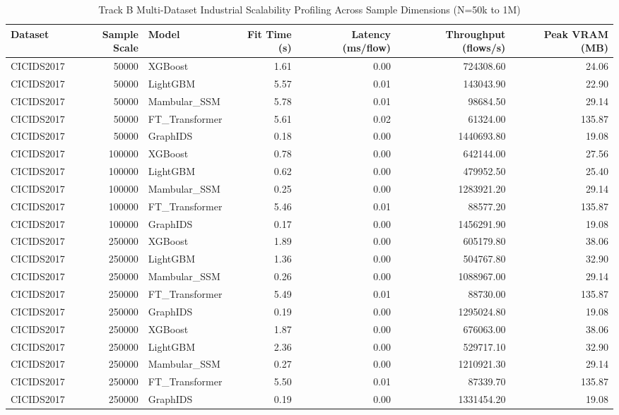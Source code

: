\begin{table}[t]
\centering
\caption{Track B Multi-Dataset Industrial Scalability Profiling Across Sample Dimensions (N=50k to 1M)}
\label{tab:multi_dataset_scalability_results}
\small
\begin{tabular}{lrlrrrr}
\toprule
Dataset & Sample Scale & Model & Fit Time (s) & Latency (ms/flow) & Throughput (flows/s) & Peak VRAM (MB) \\
\midrule
CICIDS2017 & 50000 & XGBoost & 1.61 & 0.00 & 724308.60 & 24.06 \\
CICIDS2017 & 50000 & LightGBM & 5.57 & 0.01 & 143043.90 & 22.90 \\
CICIDS2017 & 50000 & Mambular_SSM & 5.78 & 0.01 & 98684.50 & 29.14 \\
CICIDS2017 & 50000 & FT_Transformer & 5.61 & 0.02 & 61324.00 & 135.87 \\
CICIDS2017 & 50000 & GraphIDS & 0.18 & 0.00 & 1440693.80 & 19.08 \\
CICIDS2017 & 100000 & XGBoost & 0.78 & 0.00 & 642144.00 & 27.56 \\
CICIDS2017 & 100000 & LightGBM & 0.62 & 0.00 & 479952.50 & 25.40 \\
CICIDS2017 & 100000 & Mambular_SSM & 0.25 & 0.00 & 1283921.20 & 29.14 \\
CICIDS2017 & 100000 & FT_Transformer & 5.46 & 0.01 & 88577.20 & 135.87 \\
CICIDS2017 & 100000 & GraphIDS & 0.17 & 0.00 & 1456291.90 & 19.08 \\
CICIDS2017 & 250000 & XGBoost & 1.89 & 0.00 & 605179.80 & 38.06 \\
CICIDS2017 & 250000 & LightGBM & 1.36 & 0.00 & 504767.80 & 32.90 \\
CICIDS2017 & 250000 & Mambular_SSM & 0.26 & 0.00 & 1088967.00 & 29.14 \\
CICIDS2017 & 250000 & FT_Transformer & 5.49 & 0.01 & 88730.00 & 135.87 \\
CICIDS2017 & 250000 & GraphIDS & 0.19 & 0.00 & 1295024.80 & 19.08 \\
CICIDS2017 & 250000 & XGBoost & 1.87 & 0.00 & 676063.00 & 38.06 \\
CICIDS2017 & 250000 & LightGBM & 2.36 & 0.00 & 529717.10 & 32.90 \\
CICIDS2017 & 250000 & Mambular_SSM & 0.27 & 0.00 & 1210921.30 & 29.14 \\
CICIDS2017 & 250000 & FT_Transformer & 5.50 & 0.01 & 87339.70 & 135.87 \\
CICIDS2017 & 250000 & GraphIDS & 0.19 & 0.00 & 1331454.20 & 19.08 \\

\end{tabular}
\end{table}
